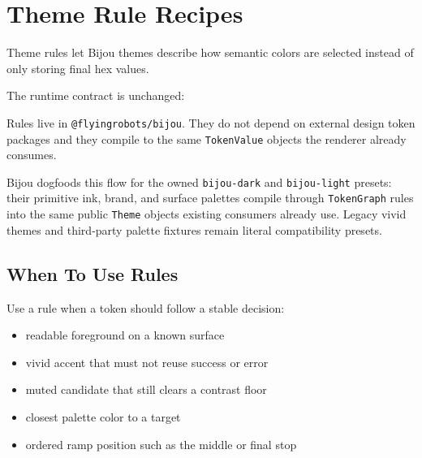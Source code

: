 \chapter{Theme Rule Recipes}\label{record-027}

\smallskip

Theme rules let Bijou themes describe how semantic colors are selected instead of only storing final hex values.

The runtime contract is unchanged:



Rules live in \texttt{@\allowbreak{}f\allowbreak{}l\allowbreak{}y\allowbreak{}i\allowbreak{}n\allowbreak{}g\allowbreak{}r\allowbreak{}o\allowbreak{}b\allowbreak{}o\allowbreak{}t\allowbreak{}s\allowbreak{}/\allowbreak{}b\allowbreak{}i\allowbreak{}j\allowbreak{}o\allowbreak{}u}. They do not depend on external design token packages and they compile to the same \texttt{T\allowbreak{}o\allowbreak{}k\allowbreak{}e\allowbreak{}n\allowbreak{}V\allowbreak{}a\allowbreak{}l\allowbreak{}u\allowbreak{}e} objects the renderer already consumes.

Bijou dogfoods this flow for the owned \texttt{b\allowbreak{}i\allowbreak{}j\allowbreak{}o\allowbreak{}u\allowbreak{}-\allowbreak{}d\allowbreak{}a\allowbreak{}r\allowbreak{}k} and \texttt{b\allowbreak{}i\allowbreak{}j\allowbreak{}o\allowbreak{}u\allowbreak{}-\allowbreak{}l\allowbreak{}i\allowbreak{}g\allowbreak{}h\allowbreak{}t} presets: their primitive ink, brand, and surface palettes compile through \texttt{T\allowbreak{}o\allowbreak{}k\allowbreak{}e\allowbreak{}n\allowbreak{}G\allowbreak{}r\allowbreak{}a\allowbreak{}p\allowbreak{}h} rules into the same public \texttt{T\allowbreak{}h\allowbreak{}e\allowbreak{}m\allowbreak{}e} objects existing consumers already use. Legacy vivid themes and third-party palette fixtures remain literal compatibility presets.

\section{When To Use Rules}\label{record-027-when-to-use-rules}

Use a rule when a token should follow a stable decision:

\begin{itemize}
\tightlist
\item
  readable foreground on a known surface
\item
  vivid accent that must not reuse success or error
\item
  muted candidate that still clears a contrast floor
\item
  closest palette color to a target
\item
  ordered ramp position such as the middle or final stop
\end{itemize}

